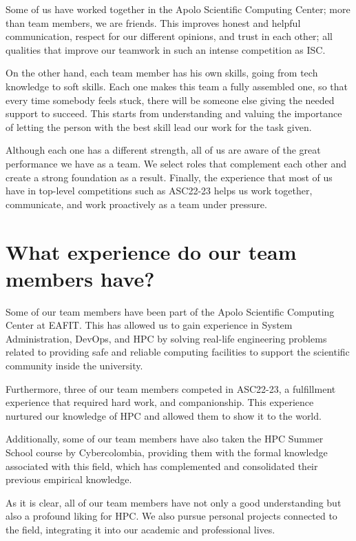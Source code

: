\documentclass[11pt,a4paper,twocolumn]{article}
\begin{document}
Some of us have worked together in the Apolo Scientific Computing Center; more than team members, we are friends. This improves honest and helpful communication, respect for our different opinions, and trust in each other; all qualities that improve our teamwork in such an intense competition as ISC.

On the other hand, each team member has his own skills, going from tech knowledge to soft skills. Each one makes this team a fully assembled one, so that every time somebody feels stuck, there will be someone else giving the needed support to succeed. This starts from understanding and valuing the importance of letting the person with the best skill lead our work for the task given.

Although each one has a different strength, all of us are aware of the great performance we have as a team. We select roles that complement each other and create a strong foundation as a result. Finally, the experience that most of us have in top-level competitions such as ASC22-23 helps us work together, communicate, and work proactively as a team under pressure.

\section{What experience do our team members have?}

Some of our team members have been part of the Apolo Scientific Computing Center at EAFIT. This has allowed us to gain experience in System Administration, DevOps, and HPC by solving real-life engineering problems related to providing safe and reliable computing facilities to support the scientific community inside the university.

Furthermore, three of our team members competed in ASC22-23, a fulfillment experience that required hard work, and companionship. This experience nurtured our knowledge of HPC and allowed them to show it to the world.

Additionally, some of our team members have also taken the HPC Summer School course by Cybercolombia, providing them with the formal knowledge associated with this field, which has complemented and consolidated their previous empirical knowledge.

As it is clear, all of our team members have not only a good understanding but also a profound liking for HPC. We also pursue personal projects connected to the field, integrating it into our academic and professional lives.
\end{document}
